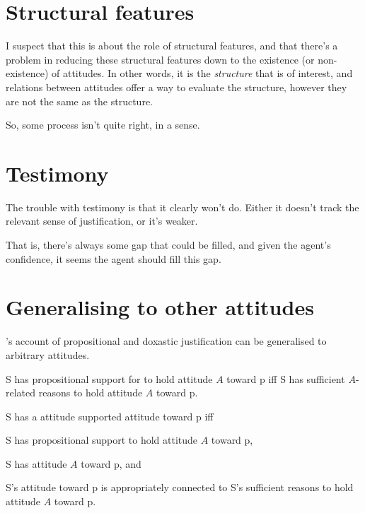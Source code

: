 \documentclass[10pt]{article}
\begin{document}
\section{Structural features}
\label{sec:structural-features}

I suspect that this is about the role of structural features, and that there's a problem in reducing these structural features down to the existence (or non-existence) of attitudes.
In other words, it is the \emph{structure} that is of interest, and relations between attitudes offer a way to evaluate the structure, however they are not the same as the structure.

So, some process isn't quite right, in a sense.



\section{Testimony}
\label{sec:testimony-1}

The trouble with testimony is that it clearly won't do.
Either it doesn't track the relevant sense of justification, or it's weaker.

That is, there's always some gap that could be filled, and given the agent's confidence, it seems the agent should fill this gap.


\section{Generalising to other attitudes}
\label{sec:gener-other-attit}

\citeauthor{Silva:2020aa}'s account of propositional and doxastic justification can be generalised to arbitrary attitudes.

\begin{description}[font=\bfseries, leftmargin=.75cm, style=nextline]
\item[Propositional Support (PS):] S has propositional support for to hold attitude \(A\) toward p iff S has sufficient \(A\)-related reasons to hold attitude \(A\) toward p.
\item[Attitude Support (AS):] S has a attitude supported attitude toward p iff
  \begin{enumerate*}[label=(\roman*)]
  \item S has propositional support to hold attitude \(A\) toward p,
  \item S has attitude \(A\) toward p, and
  \item S's attitude toward p is appropriately connected to S's sufficient reasons to hold attitude \(A\) toward p.
  \end{enumerate*}
\end{description}
\end{document}
